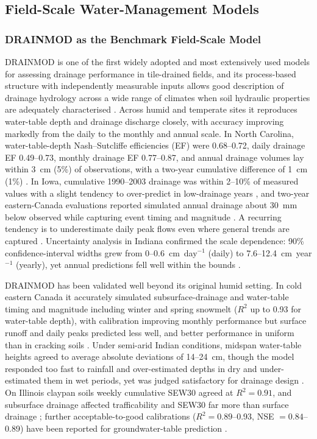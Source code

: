 \documentclass[11pt]{article}
\begin{document}
\subsection{Field-Scale Water-Management Models}

\subsubsection{DRAINMOD as the Benchmark Field-Scale Model}

\textsc{DRAINMOD} is one of the first widely adopted and most extensively used models for assessing drainage performance in tile-drained fields, and its process-based structure with independently measurable inputs allows good description of drainage hydrology across a wide range of climates when soil hydraulic properties are adequately characterised \parencite{Singh2019b,Gowda2012}. Across humid and temperate sites it reproduces water-table depth and drainage discharge closely, with accuracy improving markedly from the daily to the monthly and annual scale. In North Carolina, water-table-depth Nash--Sutcliffe efficiencies (EF) were 0.68--0.72, daily drainage EF 0.49--0.73, monthly drainage EF 0.77--0.87, and annual drainage volumes lay within 3~cm (5\%) of observations, with a two-year cumulative difference of 1~cm (1\%) \parencite{Gowda2012}. In Iowa, cumulative 1990--2003 drainage was within 2--10\% of measured values with a slight tendency to over-predict in low-drainage years \parencite{Singh2006b}, and two-year eastern-Canada evaluations reported simulated annual drainage about 30~mm below observed while capturing event timing and magnitude \parencite{Dayyani2009}. A recurring tendency is to underestimate daily peak flows even where general trends are captured \parencite{Morrison2014,Singh1996}. Uncertainty analysis in Indiana confirmed the scale dependence: 90\% confidence-interval widths grew from 0--0.6~cm~day$^{-1}$ (daily) to 7.6--12.4~cm~year$^{-1}$ (yearly), yet annual predictions fell well within the bounds \parencite{Wang2006}.

\textsc{DRAINMOD} has been validated well beyond its original humid setting. In cold eastern Canada it accurately simulated subsurface-drainage and water-table timing and magnitude including winter and spring snowmelt ($R^2$ up to 0.93 for water-table depth), with calibration improving monthly performance but surface runoff and daily peaks predicted less well, and better performance in uniform than in cracking soils \parencite{Dayyani2009,Morrison2014}. Under semi-arid Indian conditions, midspan water-table heights agreed to average absolute deviations of 14--24~cm, though the model responded too fast to rainfall and over-estimated depths in dry and under-estimated them in wet periods, yet was judged satisfactory for drainage design \parencite{GUPTA1993}. On Illinois claypan soils weekly cumulative SEW30 agreed at $R^2=0.91$, and subsurface drainage affected trafficability and SEW30 far more than surface drainage \parencite{MOSTAGHIMI1989}; further acceptable-to-good calibrations ($R^2=0.89$--0.93, NSE $=0.84$--0.89) have been reported for groundwater-table prediction \parencite{Abduljaleel2023,Awad2022b}.
\end{document}
